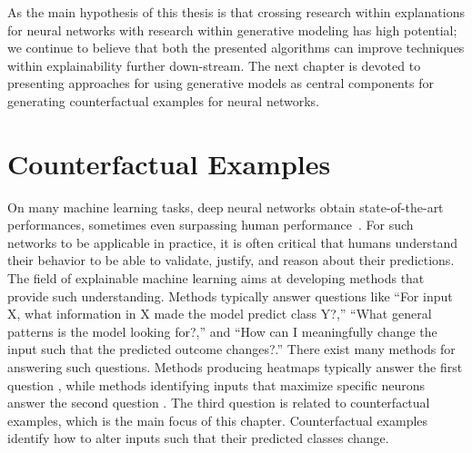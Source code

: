 \documentclass[11pt,a4paper,twoside,openright,final]{memoir}
\begin{document}
As the main hypothesis of this thesis is that crossing research within explanations for neural networks with research within generative modeling has high potential; we continue to believe that both the presented algorithms can improve techniques within explainability further down-stream.
The next chapter is devoted to presenting approaches for using generative models as central components for generating counterfactual examples for neural networks. 

\chapter{Counterfactual Examples} \label{chap:ecinn-main}

On many machine learning tasks, deep neural networks obtain state-of-the-art performances, sometimes even surpassing human performance~\cite{noisyStudent}.
For such networks to be applicable in practice, it is often critical that humans understand their behavior to be able to validate, justify, and reason about their predictions. 
The field of explainable machine learning aims at developing methods that provide such understanding.
Methods typically answer questions like ``For input X, what information in X made the model predict class Y?,''  ``What general patterns is the model looking for?,'' and ``How can I meaningfully change the input such that the predicted outcome changes?.'' 
There exist many methods for answering such questions. 
Methods producing heatmaps typically answer the first question \cite{lrp}, while methods identifying inputs that maximize specific neurons answer the second question \cite{carter2019activation}. 
The third question is related to counterfactual examples, which is the main focus of this chapter.
Counterfactual examples identify how to alter inputs such that their predicted classes change.
\end{document}
